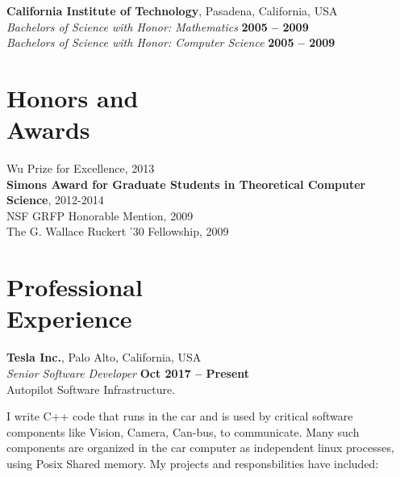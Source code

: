 \documentclass[margin,line]{resume}
\begin{document}
\begin{resume}
    \textbf{California Institute of Technology}, Pasadena, California, USA \vspace{2mm}\\\vspace{1mm}%
    \textsl{Bachelors of Science with Honor: Mathematics} \hfill \textbf{ 2005 -- 2009}\\
    \textsl{Bachelors of Science with Honor: Computer Science} \hfill \textbf{ 2005 -- 2009}\vspace{-3mm}\\%

    \section{\mysidestyle Honors and\\Awards} 

    Wu Prize for Excellence, 2013 \vspace{1mm}\\
    {\bf Simons Award for Graduate Students in Theoretical Computer Science}, 2012-2014		    \vspace{1mm}\\
    NSF GRFP Honorable Mention, 2009								    \vspace{1mm}\\%
    The G. Wallace Ruckert '30 Fellowship, 2009 						    \vspace{1mm}\\%
    
    \section{\mysidestyle Professional\\Experience}

    \textbf{Tesla Inc.}, Palo Alto, California, USA \vspace{2mm}\\\vspace{1mm}%
    \textsl{Senior Software Developer} \hfill \textbf{Oct 2017 -- Present}\\
    Autopilot Software Infrastructure.
    
    I write C++ code that runs in the car and is used by critical software components like
    Vision, Camera, Can-bus, to communicate. Many such components are organized
    in the car computer as independent linux processes, using Posix Shared memory.
    My projects and responsbilities have included:
    

\end{resume}
\end{document}
